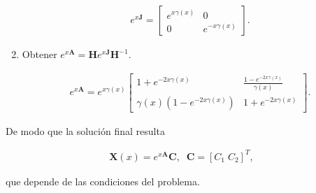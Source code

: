 \begin{enumerate}
	\begin{align}
	e^{x\textbf{J}} =  
	\begin{bmatrix}
	e^{x \gamma(x)} & 0 \\
	0 & e^{-x \gamma(x)}
	\end{bmatrix}.
	\end{align}
	
	\item Obtener $e^{x\textbf{A}} = \textbf{H} e^{x\textbf{J}} \textbf{H}^{-1}$.
	
	\begin{align}
	e^{x\textbf{A}} =  e^{x\gamma(x)}
	\begin{bmatrix}
	1+e^{-2x \gamma(x)} & \frac{1-e^{-2x\gamma(x)}}{\gamma(x)} \\
	\gamma(x) (1-e^{-2x\gamma(x)}) & 1+e^{-2x \gamma(x)}
	\end{bmatrix}.
	\end{align}
	
\end{enumerate}

De modo que la solución final resulta

\begin{align}
\textbf{X}(x) = e^{x\textbf{A}} \textbf{C}, \;\;\textbf{C} = [C_1\; C_2]^{T},
\end{align}

que depende de las condiciones del problema.